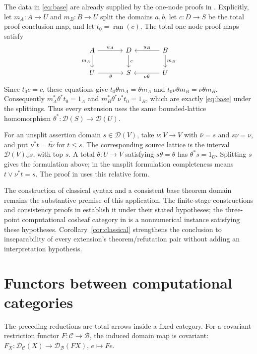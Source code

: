 \documentclass[11pt]{article}
\newcommand{\D}{\mathscr D}
\newcommand{\ran}{\operatorname{ran}}
\begin{document}
The data in \eqref{eq:base} are already supplied by the one-node
proofs in \cite[Corollary 6.3]{General}. Explicitly, let
$m_A:A\to U$ and $m_B:B\to U$ split the domains $a,b$,
let $c:D\to S$ be the total proof-conclusion map, and let
$t_0=\ran(c)$. The total one-node proof maps satisfy
\[
 \begin{tikzcd}[column sep=large]
 A\arrow[r,"u_A"]\arrow[d,"m_A"']&D\arrow[d,"c"]&
 B\arrow[l,"u_B"']\arrow[d,"m_B"]\\
 U\arrow[r,"\theta"']&S&U\arrow[l,"\nu\theta"]
 \end{tikzcd}
\]
Since $t_0c=c$, these equations give
$t_0\theta m_A=\theta m_A$ and
$t_0\nu\theta m_B=\nu\theta m_B$.
Consequently $m_A^*\theta^*t_0=1_A$ and
$m_B^*\theta^*\nu^*t_0=1_B$, which are exactly
\eqref{eq:base} under the splittings. Thus every extension uses the
same bounded-lattice homomorphism $\theta^*:\D(S)\to\D(U)$.

For an unsplit assertion domain $s\in\D(V)$, take
$\nu:V\to V$ with $\bar\nu=s$ and $s\nu=\nu$, and put
$\nu^*t=\overline{t\nu}$ for $t\le s$.
The corresponding source lattice is the interval
$\D(V)\mathord\downarrow s$, with top $s$.
A total $\theta:U\to V$ satisfying $s\theta=\theta$
has $\theta^*s=1_U$. Splitting $s$ gives the formulation above;
in the unsplit formulation completeness means $t\vee\nu^*t=s$.
The proof in \cite[Theorem 6.1]{Domains} uses this relative form.

The construction of classical syntax and a consistent base theorem
domain remains the substantive premise of this application. The
finite-stage constructions and consistency proofs in
\cite{General,Iteration} establish it under their stated hypotheses;
the three-point computational cosheaf category in \cite{ThreePoint}
is a nonnumerical instance satisfying these hypotheses.
Corollary~\ref{cor:classical}
strengthens the conclusion to inseparability of every extension's
theorem/refutation pair without adding an interpretation hypothesis.

\section{Functors between computational categories}

The preceding reductions are total arrows inside a fixed category.
For a covariant restriction functor $F:\mathscr C\to\mathscr B$,
the induced domain map is covariant:
$F_X:\D_{\mathscr C}(X)\to\D_{\mathscr B}(FX)$,
$e\mapsto Fe$.
\end{document}

